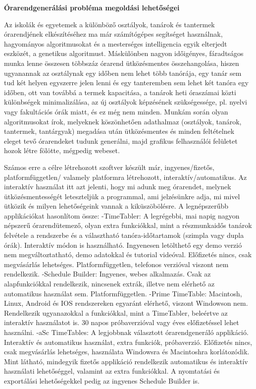 \documentclass[a4paper,12pt]{article}
\begin{document}
\begin{center}
    \huge \textbf{Órarendgenerálási probléma megoldási lehetőségei} 
\end{center}

Az iskolák és egyetemek a különböző osztályok, tanárok és tantermek órarendjének 
elkészítéséhez ma már számítógépes segítséget használnak, hagyományos algoritmusokat és a
mesterséges intelligencia egyik elterjedt eszközét, a genetikus algoritmust. Máskülönben 
nagyon időigényes, fáradtságos munka lenne összesen többszáz órarend ütközésmentes 
összehangolása, hiszen ugyanannak az osztálynak egy időben nem lehet több tanórája, egy tanár
sem tud két helyen egyszerre jelen lenni és egy tanteremben sem lehet két tanóra egy időben,
ott van továbbá a termek kapacitása, a tanárok heti óraszámai közti különbségek 
minimalizálása, az új osztályok képzésének szükségessége, pl. nyelvi vagy fakultációs órák 
miatt, és ez még nem minden. Munkám során olyan algoritmusokat írok, melyeknek köszönhetően 
adathalmaz (osztályok, tanárok, tantermek, tantárgyak) megadása után ütközésmentes és minden
feltételnek eleget tevő órarendeket tudunk generálni, majd grafikus felhasználói felületet 
hozok létre fölötte, mégpedig webeset.

Számos erre a célre létrehozott szoftver készült már, ingyenes/fizetős, platformfüggetlen/
valamely platformra létrehozott, interaktív/automatikus. Az interaktív használat itt azt
jelenti, hogy mi adunk meg órarendet, melynek ütközésmentességét leteszteljük a programmal,
ami jelzésünkre adja, mi mivel ütközik és milyen lehetőségeink vannak a kiküszöbölésre. 
A legnépszerűbb applikációkat hasonlítom össze:
-TimeTabler: A legrégebbi, mai napig nagyon népszerű órarendütemező, olyan extra funkciókkal,
             mint a részmunkaidős tanárok felvétele a rendszerbe és a választható
             tanóra-időtartamok (szimpla vagy dupla órák). Interaktív módon is használható. 
             Ingyenesen letölthető egy demo verzió nem megváltoztatható, demo adatokkal és 
             tutorial videóval. Előfizetés nincs, csak megvásárlás lehetséges. 
             Platformfüggetlen, telefonos verzióval viszont nem rendelkezik.
-Schedule Builder: Ingyenes, webes alkalmazás. Csak az alapfunkciókkal rendelkezik,
                   nincsenek extrák, illetve nem elérhető az automatikus használat sem.
                   Platformfüggetlen.
-Prime TimeTable: Macintosh, Linux, Android és IOS rendszereken egyaránt elérhető, viszont
                  Windowson nem. Rendelkezik ugyanazokkal a funkciókkal, mint a TimeTabler,
                  beleértve az interaktív használatot is. 30 napos próbaverzióval vagy éves
                  előfizetéssel lehet használni.
-aSc TimeTables: A legjobbnak választott órarendgeneráló applikáció. Interaktív és
                 automatikus használat, extra funkciók, próbaverzió. Előfizetés nincs, csak
                 megvásárlás lehetséges, használata Windowsra és Macintoshra korlátozódik.
Mint látható, mindegyik fizetős applikáció rendelkezik automatikus és interaktív használati
lehetőséggel, valamint az extra funkciókkal. A nyomtatási és exportálási lehetőségekkel
pedig az ingyenes Schedule Builder is. 
\end{document}
